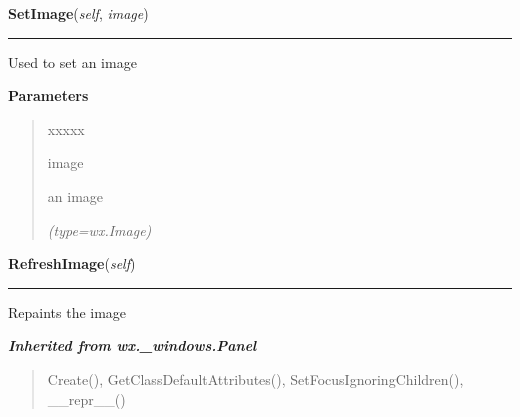     \vspace{0.5ex}

\hspace{.8\funcindent}\begin{boxedminipage}{\funcwidth}

    \raggedright \textbf{SetImage}(\textit{self}, \textit{image})

    \vspace{-1.5ex}

    \rule{\textwidth}{0.5\fboxrule}
\setlength{\parskip}{2ex}
    Used to set an image

\setlength{\parskip}{1ex}
      \textbf{Parameters}
      \vspace{-1ex}

      \begin{quote}
        \begin{Ventry}{xxxxx}

          \item[image]

          an image

            {\it (type=wx.Image)}

        \end{Ventry}

      \end{quote}

    \end{boxedminipage}

    \label{ImagePanel:ImagePanel:RefreshImage}

    \vspace{0.5ex}

\hspace{.8\funcindent}\begin{boxedminipage}{\funcwidth}

    \raggedright \textbf{RefreshImage}(\textit{self})

    \vspace{-1.5ex}

    \rule{\textwidth}{0.5\fboxrule}
\setlength{\parskip}{2ex}
    Repaints the image

\setlength{\parskip}{1ex}
    \end{boxedminipage}


\large{\textbf{\textit{Inherited from wx.\_windows.Panel}}}

\begin{quote}
Create(), GetClassDefaultAttributes(), SetFocusIgnoringChildren(), \_\_repr\_\_()
\end{quote}

